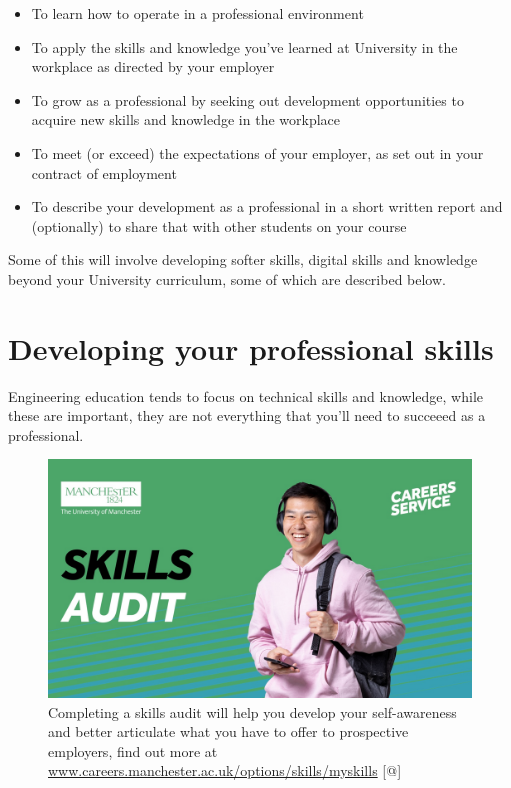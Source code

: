 \documentclass[
]{book}
\providecommand{\tightlist}{%
  \setlength{\itemsep}{0pt}\setlength{\parskip}{0pt}}
\begin{document}
\begin{itemize}
\tightlist
\item
  To learn how to operate in a professional environment
\item
  To apply the skills and knowledge you've learned at University in the workplace as directed by your employer
\item
  To grow as a professional by seeking out development opportunities to acquire new skills and knowledge in the workplace
\item
  To meet (or exceed) the expectations of your employer, as set out in your contract of employment
\item
  To describe your development as a professional in a short written report and (optionally) to share that with other students on your course
\end{itemize}

Some of this will involve developing softer skills, digital skills and knowledge beyond your University curriculum, some of which are described below.

\section{Developing your professional skills}\label{soft}

Engineering education tends to focus on technical skills and knowledge, while these are important, they are not everything that you'll need to succeeed as a professional.

\begin{figure}

{\centering \includegraphics[width=1\linewidth]{images/skills-audit-graphic} 

}

\caption{Completing a skills audit will help you develop your self-awareness and better articulate what you have to offer to prospective employers, find out more at \href{https://www.careers.manchester.ac.uk/options/skills/myskills/}{www.careers.manchester.ac.uk/options/skills/myskills} {[}@{]}}\label{fig:skillsaudit-fig}
\end{figure}
\end{document}
